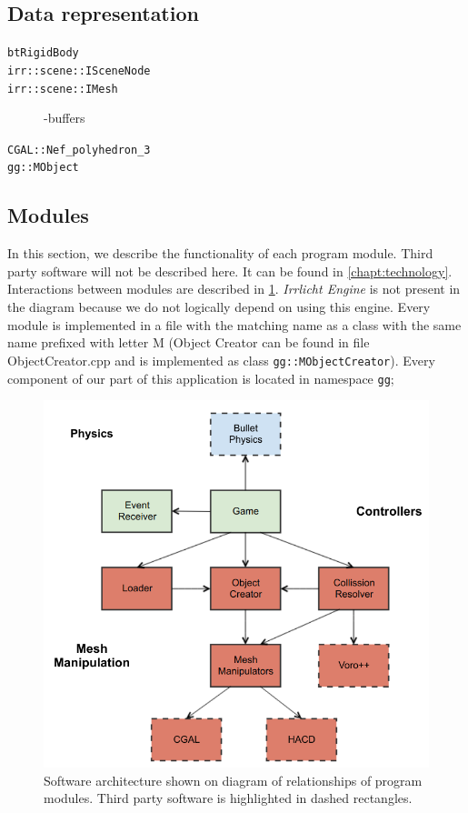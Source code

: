 \subsection{Data representation}
\begin{description}
\item [{\tt btRigidBody}]
\item [{\tt irr::scene::ISceneNode}]
\item [{\tt irr::scene::IMesh}] -buffers
\item [{\tt CGAL::Nef\_polyhedron\_3}]
\item [{\tt gg::MObject}]
\end{description}


\subsection{Modules}
In this section, we describe the functionality of each program module. Third party software will not be described here. It can be found in \cref{chapt:technology}. Interactions between modules are described in \cref{fig:modules}. \emph{Irrlicht Engine} is not present in the diagram because we do not logically depend on using this engine. Every module is implemented in a file with the matching name as a class with the same name prefixed with letter M (Object Creator can be found in file ObjectCreator.cpp and is implemented as class {\tt gg::MObjectCreator}). Every component of our part of this application is located in namespace {\tt gg};

\begin{figure}[ht!]
        \centering
        \includegraphics[width=\textwidth]{img/objectmodel}
        \caption{Software architecture shown on diagram of relationships of program modules. Third party software is highlighted in dashed rectangles.}
        \label{fig:modules}
\end{figure}


